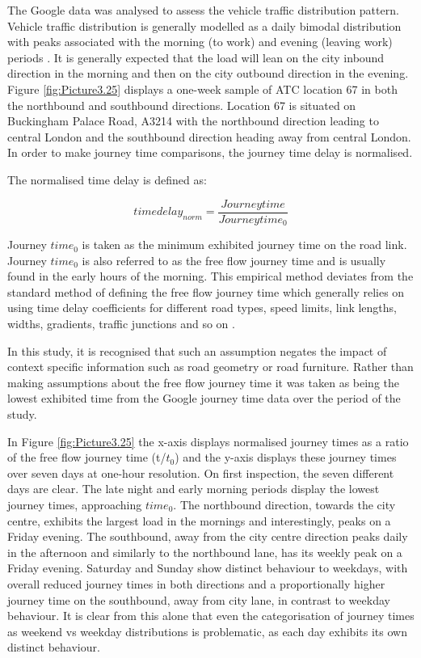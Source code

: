 \documentclass{CUP-JNL-DCE}
\begin{document}
The Google data was analysed to assess the vehicle traffic distribution pattern. Vehicle traffic distribution is generally modelled as a daily bimodal distribution with peaks associated with the morning (to work) and evening (leaving work) periods \citep{mullick2012dynamics}. It is generally expected that the load will lean on the city inbound direction in the morning and then on the city outbound direction in the evening. Figure \ref{fig:Picture3.25} displays a one-week sample of ATC location 67 in both the northbound and southbound directions. Location 67 is situated on Buckingham Palace Road, A3214 with the northbound direction leading to central London and the southbound direction heading away from central London. In order to make journey time comparisons, the journey time delay is normalised. 

The normalised time delay is defined as:

\begin{equation}
	time delay_{norm} = \frac{Journey time}{Journey time_{0}}
\end{equation}

\vspace{2mm}

Journey $time_{0}$ is taken as the minimum exhibited journey time on the road link. Journey $time_{0}$ is also referred to as the free flow journey time and is usually found in the early hours of the morning. This empirical method deviates from the standard method of defining the free flow journey time which generally relies on using time delay coefficients for different road types, speed limits, link lengths, widths, gradients, traffic junctions and so on \citep{DfT_cost_benefit}.

In this study, it is recognised that such an assumption negates the impact of context specific information such as road geometry or road furniture. Rather than making assumptions about the free flow journey time it was taken as being the lowest exhibited time from the Google journey time data over the period of the study.

In Figure \ref{fig:Picture3.25} the x-axis displays normalised journey times as a ratio of the free flow journey time (t/$t_{0}$) and the y-axis displays these journey times over seven days at one-hour resolution. On first inspection, the seven different days are clear. The late night and early morning periods display the lowest journey times, approaching $time_{0}$. The northbound direction, towards the city centre, exhibits the largest load in the mornings and interestingly, peaks on a Friday evening. The southbound, away from the city centre direction peaks daily in the afternoon and similarly to the northbound lane, has its weekly peak on a Friday evening. Saturday and Sunday show distinct behaviour to weekdays, with overall reduced journey times in both directions and a proportionally higher journey time on the southbound, away from city lane, in contrast to weekday behaviour.  It is clear from this alone that even the categorisation of journey times as weekend vs weekday distributions \citep{mullick2012dynamics} is problematic, as each day exhibits its own distinct behaviour.
\end{document}
